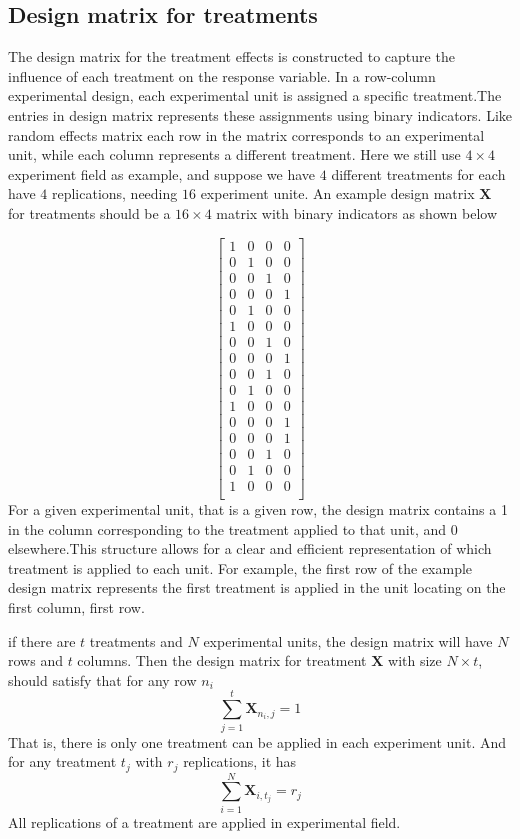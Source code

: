 \documentclass[
  a4paper,
  oneside,
  openany,
  12pt,
  onecolumn]{book}
\theoremstyle{definition}
\theoremstyle{plain}
\theoremstyle{remark}
\begin{document}
\subsection{Design matrix for
treatments}\label{design-matrix-for-treatments}

The design matrix for the treatment effects is constructed to capture
the influence of each treatment on the response variable. In a
row-column experimental design, each experimental unit is assigned a
specific treatment.The entries in design matrix represents these
assignments using binary indicators. Like random effects matrix each row
in the matrix corresponds to an experimental unit, while each column
represents a different treatment. Here we still use \(4\times 4\)
experiment field as example, and suppose we have \(4\) different
treatments for each have \(4\) replications, needing \(16\) experiment
unite. An example design matrix \(\boldsymbol{X}\) for treatments should
be a \(16\times 4\) matrix with binary indicators as shown below

\[
\begin{bmatrix}
1 & 0 & 0 & 0\\
0 & 1 & 0 & 0\\
0 & 0 & 1 & 0\\
0 & 0 & 0 & 1\\
0 & 1 & 0 & 0\\
1 & 0 & 0 & 0\\
0 & 0 & 1 & 0\\
0 & 0 & 0 & 1\\
0 & 0 & 1 & 0\\
0 & 1 & 0 & 0\\
1 & 0 & 0 & 0\\
0 & 0 & 0 & 1\\
0 & 0 & 0 & 1\\
0 & 0 & 1 & 0\\
0 & 1 & 0 & 0\\
1 & 0 & 0 & 0\\
\end{bmatrix}
\] For a given experimental unit, that is a given row, the design matrix
contains a 1 in the column corresponding to the treatment applied to
that unit, and 0 elsewhere.This structure allows for a clear and
efficient representation of which treatment is applied to each unit. For
example, the first row of the example design matrix represents the first
treatment is applied in the unit locating on the first column, first
row.

if there are \(t\) treatments and \(N\) experimental units, the design
matrix will have \(N\) rows and \(t\) columns. Then the design matrix
for treatment \(\boldsymbol{X}\) with size \(N\times t\), should satisfy
that for any row \(n_{i}\) \[
\sum_{j=1}^{t} \boldsymbol{X}_{n_{i},j}=1
\] That is, there is only one treatment can be applied in each
experiment unit. And for any treatment \(t_j\) with \(r_j\)
replications, it has \[
\sum_{i=1}^{N}\boldsymbol{X}_{i,t_j}=r_j
\] All replications of a treatment are applied in experimental field.
\end{document}
